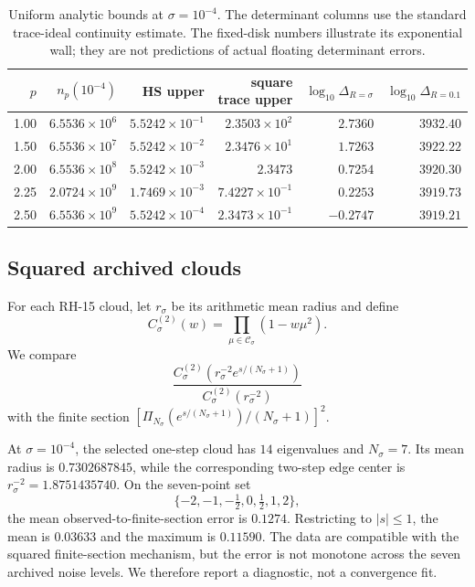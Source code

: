 \documentclass[11pt]{article}
\theoremstyle{definition}
\theoremstyle{remark}
\begin{document}
\begin{table}[H]
\centering
\small
\begin{tabular}{rrrrrr}
\toprule
$p$ & $n_p(10^{-4})$ & HS upper & square trace upper
& $\log_{10}\Delta_{R=\sigma}$
& $\log_{10}\Delta_{R=0.1}$\\
\midrule
1.00 & $6.5536\times10^6$ & $5.5242\times10^{-1}$
& $2.3503\times10^2$ & $2.7360$ & $3932.40$\\
1.50 & $6.5536\times10^7$ & $5.5242\times10^{-2}$
& $2.3476\times10^1$ & $1.7263$ & $3922.22$\\
2.00 & $6.5536\times10^8$ & $5.5242\times10^{-3}$
& $2.3473$ & $0.7254$ & $3920.30$\\
2.25 & $2.0724\times10^9$ & $1.7469\times10^{-3}$
& $7.4227\times10^{-1}$ & $0.2253$ & $3919.73$\\
2.50 & $6.5536\times10^9$ & $5.5242\times10^{-4}$
& $2.3473\times10^{-1}$ & $-0.2747$ & $3919.21$\\
\bottomrule
\end{tabular}
\caption{Uniform analytic bounds at $\sigma=10^{-4}$.  The determinant
columns use the standard trace-ideal continuity estimate.  The fixed-disk
numbers illustrate its exponential wall; they are not predictions of actual
floating determinant errors.}
\label{tab:schedules}
\end{table}

\subsection{Squared archived clouds}

For each RH-15 cloud, let $r_\sigma$ be its arithmetic mean radius and define
\begin{equation}
 C_\sigma^{(2)}(w)
 =\prod_{\mu\in\mathcal C_\sigma}(1-w\mu^2).
 \label{eq:observed-square-cloud}
\end{equation}
We compare
\begin{equation}
 \frac{C_\sigma^{(2)}
 (r_\sigma^{-2}e^{s/(N_\sigma+1)})}
 {C_\sigma^{(2)}(r_\sigma^{-2})}
 \label{eq:observed-profile}
\end{equation}
with the finite section
$[\Pi_{N_\sigma}(e^{s/(N_\sigma+1)})/(N_\sigma+1)]^2$.

At $\sigma=10^{-4}$, the selected one-step cloud has $14$ eigenvalues and
$N_\sigma=7$.  Its mean radius is $0.7302687845$, while the corresponding
two-step edge center is $r_\sigma^{-2}=1.8751435740$.  On the seven-point set
\[
 \{-2,-1,-\tfrac12,0,\tfrac12,1,2\},
\]
the mean observed-to-finite-section error is $0.1274$.  Restricting to
$|s|\le1$, the mean is $0.03633$ and the maximum is $0.11590$.  The data are compatible with the squared finite-section
mechanism, but the error is not monotone across the seven archived noise
levels.  We therefore report a diagnostic, not a convergence fit.
\end{document}
